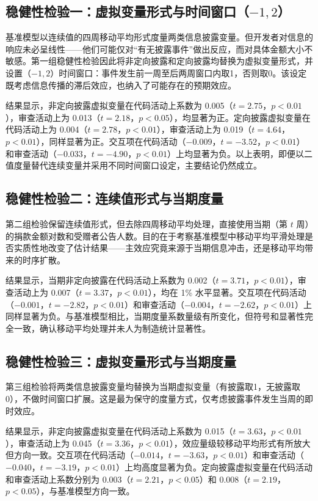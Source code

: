 \documentclass[
    type = master, %
    degree = professional,        %
    decl-page,  %
    twoside,                %
    fontset = fandol %
  ]{njuthesis}
\begin{document}
\subsection{稳健性检验一：虚拟变量形式与时间窗口（$-1, 2$）}

基准模型以连续值的四周移动平均形式度量两类信息披露变量。但开发者对信息的响应未必呈线性——他们可能仅对“有无披露事件”做出反应，而对具体金额大小不敏感。第一组稳健性检验因此将非定向披露和定向披露均替换为虚拟变量形式，并设置（$-1, 2$）时间窗口：事件发生前一周至后两周窗口内取1，否则取0。该设定既考虑信息传播的滞后效应，也纳入了可能存在的预期效应。

结果显示，非定向披露虚拟变量在代码活动上系数为 0.005（$t = 2.75$，$p < 0.01$），审查活动上为 0.013（$t = 2.18$，$p < 0.05$），均显著为正。定向披露虚拟变量在代码活动上为 0.004（$t = 2.78$，$p < 0.01$），审查活动上为 0.019（$t = 4.64$，$p < 0.01$），同样显著为正。交互项在代码活动（$-0.009$，$t = -3.52$，$p < 0.01$）和审查活动（$-0.033$，$t = -4.90$，$p < 0.01$）上均显著为负。以上表明，即便以二值度量替代连续变量并采用不同时间窗口设定，主要结论仍然成立。

\subsection{稳健性检验二：连续值形式与当期度量}

第二组检验保留连续值形式，但去除四周移动平均处理，直接使用当期（第 $t$ 周）的捐款金额对数和受赠者公告人数。目的在于考察基准模型中移动平均平滑处理是否实质性地改变了估计结果——主效应究竟来源于当期信息冲击，还是移动平均带来的时序扩散。

结果显示，当期非定向披露在代码活动上系数为 0.002（$t = 3.71$，$p < 0.01$），审查活动上为 0.007（$t = 3.37$，$p < 0.01$），均在 1\% 水平显著。交互项在代码活动（$-0.001$，$t = -2.82$，$p < 0.01$）和审查活动（$-0.004$，$t = -2.62$，$p < 0.01$）上同样显著为负。与基准模型相比，当期度量系数量级有所变化，但符号和显著性完全一致，确认移动平均处理并未人为制造统计显著性。

\subsection{稳健性检验三：虚拟变量形式与当期度量}

第三组检验将两类信息披露变量均替换为当期虚拟变量（有披露取1，无披露取0），不做时间窗口扩展。这是最为保守的度量方式，仅考虑披露事件发生当周的即时效应。

结果显示，非定向披露虚拟变量在代码活动上系数为 0.015（$t = 3.63$，$p < 0.01$），审查活动上为 0.045（$t = 3.36$，$p < 0.01$），效应量级较移动平均形式有所放大但方向一致。交互项在代码活动（$-0.014$，$t = -3.63$，$p < 0.01$）和审查活动（$-0.040$，$t = -3.19$，$p < 0.01$）上均高度显著为负。定向披露虚拟变量在代码活动和审查活动上系数分别为 0.003（$t = 2.21$，$p < 0.05$）和 0.008（$t = 2.19$，$p < 0.05$），与基准模型方向一致。
\end{document}
